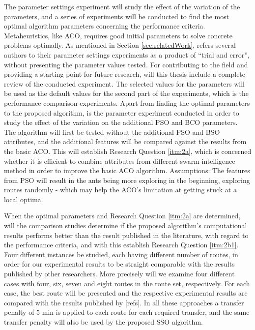 The parameter settings experiment will study the effect of the variation of the parameters, and a series of experiments will be conducted to find the most optimal algorithm parameters concerning the performance criteria. Metaheuristics, like ACO, requires good initial parameters to solve concrete problems optimally. As mentioned in Section \vref{sec:relatedWork}, refers several authors to their parameter settings experiments as a product of ``trial and error'', without presenting the parameter values tested. For contributing to the field and providing a starting point for future research, will this thesis include a complete review of the conducted experiment. The selected values for the parameters will be used as the default values for the second part of the experiments, which is the performance comparison experiments. Apart from finding the optimal parameters to the proposed algorithm, is the parameter experiment conducted in order to study the effect of the variation on the additional PSO and BCO parameters. The algorithm will first be tested without the additional PSO and BSO attributes, and the additional features will be compared against the results from the basic ACO. This will establish Research Question \vref{itm:2a}, which is concerned whether it is efficient to combine attributes from different swarm-intelligence method in order to improve the basic ACO algorithm. Assumptions: The features from PSO will result in the ants being more exploring in the beginning, exploring routes randomly - which may help the ACO's limitation at getting stuck at a local optima. 

When the optimal parameters and Research Question \vref{itm:2a} are determined, will the comparison studies determine if the proposed algorithm's computational results performs better than the result published in the literature, with regard to the performance criteria, and with this establish Research Question \vref{itm:2b1}. %
Four different instances be studied, each having different number of routes, in order for our experimental results to be straight comparable with the results published by other researchers. More precisely will we examine four different cases with four, six, seven and eight routes in the route set, respectively. For each case, the best route will be presented and the respective experimental results are compared with the results published by [refs]. In all these approaches a transfer penalty of 5 min is applied to each route for each required transfer, and the same transfer penalty will also be used by the proposed SSO algorithm. 

